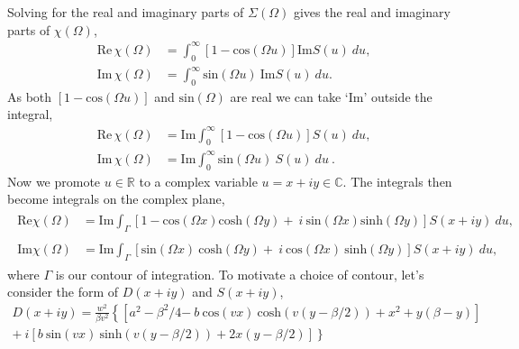 Solving for the real and imaginary parts of $\Sigma(\Omega)$ gives the real and imaginary parts of $\chi(\Omega)$,
\begin{subequations}
    \begin{align}
        \textrm{Re} \, \chi(\Omega) &= \int_0^\infty \left[ 1 - \textrm{cos}(\Omega u) \right] \textrm{Im} S(u)\ du, \\[1em]
        \textrm{Im} \, \chi(\Omega) &= \int_0^\infty \textrm{sin}(\Omega u)\ \textrm{Im} S(u)\ du .
    \end{align}
\end{subequations}
As both $[1 - \textrm{cos}(\Omega u)]$ and $\textrm{sin}(\Omega)$ are real we can take `Im' outside the integral,
\begin{subequations}
    \begin{align}
        \textrm{Re} \, \chi(\Omega) &= \textrm{Im} \int_0^\infty \left[ 1 - \textrm{cos}(\Omega u) \right] S(u)\ du,  \label{realsus} \\[1em]
        \textrm{Im} \, \chi(\Omega) &= \textrm{Im} \int_0^\infty \textrm{sin}(\Omega u)\ S(u)\ du\ . \label{imagsus}
    \end{align}
\end{subequations}
Now we promote $u \in \mathbb{R}$ to a complex variable $u = x + iy \in \mathbb{C}$. The integrals then become integrals on the complex plane, 
\begin{subequations}
\begin{align}
    \begin{split}
    \textrm{Re} \chi(\Omega) &= \textrm{Im} \int_\Gamma \left[ 1 - \textrm{cos}(\Omega x) \textrm{cosh}(\Omega y) +\ i\ \textrm{sin}(\Omega x) \textrm{sinh}(\Omega y) \right] S(x + iy)\ du,  \label{realsuscomplex} 
    \end{split} \\[1em]
    \begin{split}
    \textrm{Im}\chi(\Omega) &= \textrm{Im} \int_\Gamma \left[ \textrm{sin}(\Omega x)\ \textrm{cosh}(\Omega y) +\ i\ \textrm{cos}(\Omega x)\ \textrm{sinh}(\Omega y) \right] S(x + iy)\ du, \label{imagsuscomplex}
    \end{split}
\end{align}
\end{subequations}
where $\Gamma$ is our contour of integration. To motivate a choice of contour, let's consider the form of $D(x + iy)$ and $S(x + iy)$, 
\begin{equation}
\begin{gathered}
    D(x + i y) = \frac{w^2}{\beta v^2} \left\{\left[ a^2 - \beta^2/4 \right.\right. 
    \left.\left.-\ b\ \textrm{cos}(vx)\ \textrm{cosh}(v( y-\beta/2)) + x^2 + y(\beta - y) \right] \right. \\
    \left.+\ i \left[ b\ \textrm{sin}(vx)\ \textrm{sinh}(v(y-\beta/2)) + 2x(y-\beta/2) \right] \right\}
\end{gathered}
\end{equation}
